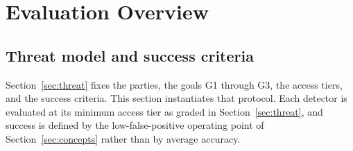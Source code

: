 %

\section{Evaluation Overview}
\label{sec:eval}

\subsection{Threat model and success criteria}
Section~\ref{sec:threat} fixes the parties, the goals G1 through G3, the access tiers,
and the success criteria. This section instantiates that protocol. Each detector is
evaluated at its minimum access tier as graded in Section~\ref{sec:threat}, and success
is defined by the low-false-positive operating point of Section~\ref{sec:concepts} rather
than by average accuracy.


